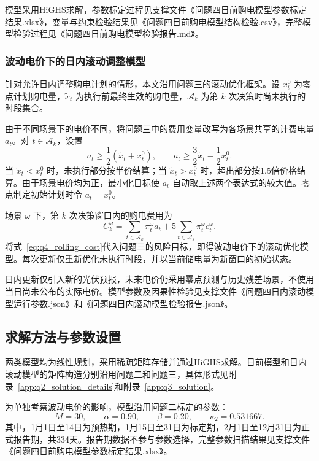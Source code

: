 模型采用HiGHS求解，参数标定过程见支撑文件《问题四日前购电模型参数标定结果.xlsx》，变量与约束检验结果见《问题四日前购电模型结构检验.csv》，完整模型检验过程见《问题四日前购电模型检验报告.md》。

\subsubsection{波动电价下的日内滚动调整模型}

针对允许日内调整购电计划的情形，本文沿用问题三的滚动优化框架。设 \(x_t^0\) 为零点计划购电量，\(\widetilde{x}_t\) 为执行前最终生效的购电量，\(\mathcal{A}_k\) 为第 \(k\) 次决策时尚未执行的时段集合。

由于不同场景下的电价不同，将问题三中的费用变量改写为各场景共享的计费电量 \(a_t\)。对 \(t\in\mathcal{A}_k\)，设置
\begin{equation}
a_t\geq
\frac{1}{2}\left(\widetilde{x}_t+x_t^0\right),
\qquad
a_t\geq
\frac{3}{2}\widetilde{x}_t-\frac{1}{2}x_t^0.
\label{eq:q4_adjust_settlement}
\end{equation}
当 \(\widetilde{x}_t<x_t^0\) 时，未执行部分按半价结算；当 \(\widetilde{x}_t>x_t^0\) 时，超出部分按1.5倍价格结算。由于场景电价均为正，最小化目标使 \(a_t\) 自动取上述两个表达式的较大值。零点制定初始计划时令 \(a_t=x_t^0\)。

场景 \(\omega\) 下，第 \(k\) 次决策窗口内的购电费用为
\begin{equation}
C_k^\omega
=
\sum_{t\in\mathcal{A}_k}\pi_t^\omega a_t
+
5\sum_{t\in\mathcal{A}_k}\pi_t^\omega e_t^\omega.
\label{eq:q4_rolling_cost}
\end{equation}
将式~\eqref{eq:q4_rolling_cost}代入问题三的风险目标，即得波动电价下的滚动优化模型。每次更新仅重新优化未执行时段，并以当前储电量为新窗口的初始状态。

日内更新仅引入新的光伏预报，未来电价仍采用零点预测与历史残差场景，不使用当日尚未公布的实际电价。模型参数及因果性检验见支撑文件《问题四日内滚动模型运行参数.json》和《问题四日内滚动模型检验报告.json》。

\subsection{求解方法与参数设置}

两类模型均为线性规划，采用稀疏矩阵存储并通过HiGHS求解。日前模型和日内滚动模型的矩阵构造分别沿用问题二和问题三，具体形式见附录~\ref{app:q2_solution_details}和附录~\ref{app:q3_solution}。

为单独考察波动电价的影响，模型沿用问题二标定的参数：
\begin{equation}
M=30,\qquad
\alpha=0.90,\qquad
\beta=0.20,\qquad
\kappa_2=0.531667.
\label{eq:q4_parameters}
\end{equation}
其中，1月1日至14日为预热期，1月15日至31日为标定期，2月1日至12月31日为正式报告期，共334天。报告期数据不参与参数选择，完整参数扫描结果见支撑文件《问题四日前购电模型参数标定结果.xlsx》。

